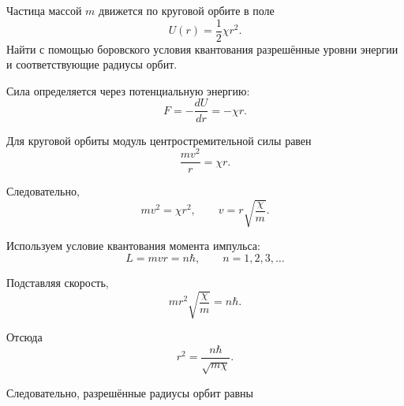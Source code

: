\documentclass[../final.tex]{subfiles}
\begin{document}



\condition
Частица массой $m$ движется по круговой орбите в поле
%
\begin{equation*}
    U(r)
    =
    \frac{1}{2}\chi r^2.
\end{equation*}
%
Найти с помощью боровского условия квантования разрешённые
уровни энергии и соответствующие радиусы орбит.



Сила определяется через потенциальную энергию:
%
\begin{equation*}
    F
    =
    -\frac{dU}{dr}
    =
    -\chi r.
\end{equation*}

Для круговой орбиты модуль центростремительной силы равен
%
\begin{equation*}
    \frac{mv^2}{r}
    =
    \chi r.
\end{equation*}

Следовательно,
%
\begin{equation*}
    mv^2
    =
    \chi r^2,
    \qquad
    v
    =
    r\sqrt{\frac{\chi}{m}}.
\end{equation*}



Используем условие квантования момента импульса:
%
\begin{equation*}
    L
    =
    mvr
    =
    n\hbar,
    \qquad
    n=1,2,3,\ldots
\end{equation*}

Подставляя скорость,
%
\begin{equation*}
    mr^2
    \sqrt{\frac{\chi}{m}}
    =
    n\hbar.
\end{equation*}

Отсюда
%
\begin{equation*}
    r^2
    =
    \frac{n\hbar}{\sqrt{m\chi}}.
\end{equation*}

Следовательно, разрешённые радиусы орбит равны
\end{document}
